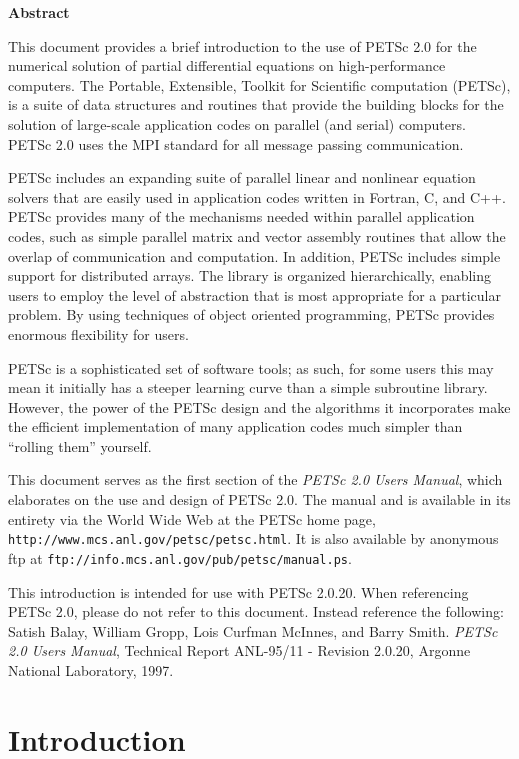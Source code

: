 \vspace{1.0cm}

\begin{center} {\bf Abstract} \end{center}

This document provides a brief introduction to
the use of PETSc 2.0 for the numerical solution
of partial differential equations on high-performance computers.  The
Portable, Extensible, Toolkit for Scientific computation (PETSc), is a
suite of data structures and routines that provide the building
blocks for the solution of large-scale application codes on parallel
(and serial) computers.  PETSc 2.0 uses the MPI standard for all
message passing communication.

PETSc includes an expanding suite of parallel linear and nonlinear
equation solvers that are easily used in application codes written in
Fortran, C, and C++.  PETSc provides many of the mechanisms needed
within parallel application codes, such as simple parallel matrix and
vector assembly routines that allow the overlap of communication and
computation.  In addition, PETSc includes simple support for
distributed arrays.  The library is organized
hierarchically, enabling users to employ the level of abstraction that
is most appropriate for a particular problem. By using techniques 
of object oriented programming, PETSc provides enormous flexibility 
for users.

PETSc is a sophisticated set of software tools; as such, for some
users this may mean it initially has a steeper learning curve than a
simple subroutine library. However, the power of the PETSc design and
the algorithms it incorporates make the efficient implementation of
many application codes much simpler than ``rolling them'' yourself.

This document serves as the first section of the {\em PETSc 2.0 Users
Manual}, which elaborates on the use and design of PETSc 2.0. The
manual and is available in its entirety via the World Wide Web at
the PETSc home page, {\tt http://www.mcs.anl.gov/petsc/petsc.html}.
It is also available
by anonymous ftp at {\tt ftp://info.mcs.anl.gov/pub/petsc/manual.ps}.

\vspace{1.2cm}

 This introduction is intended for use with
PETSc 2.0.20. When referencing PETSc 2.0, please do 
not refer to this document. Instead reference the following: Satish
Balay, William Gropp, Lois Curfman McInnes, and Barry Smith.  {\em
PETSc 2.0 Users Manual}, Technical Report ANL-95/11 - Revision 2.0.20,
Argonne National Laboratory, 1997.

%
\newpage


\newpage
\section{Introduction}



